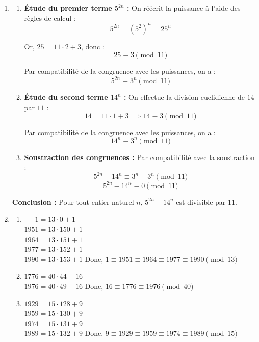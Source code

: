 \begin{enumerate}[label=\thechapter.\arabic*, font=\bfseries, itemsep=7mm,labelsep*=3mm,left=0mm]
\item

\begin{enumerate}
	\item \textbf{Étude du premier terme $5^{2n}$ :}
	On réécrit la puissance à l'aide des règles de calcul :
	$$5^{2n} = \left(5^2\right)^n = 25^n$$
	
	Or, $25 = 11 \cdot 2 + 3$, donc :
	$$25 \equiv 3 \pmod{11}$$
	
	Par compatibilité de la congruence avec les puissances, on a :
	$$5^{2n} \equiv 3^n \pmod{11}$$
	
	\item \textbf{Étude du second terme $14^n$ :}
	On effectue la division euclidienne de $14$ par $11$ :
	$$14 = 11 \cdot 1 + 3 \implies 14 \equiv 3 \pmod{11}$$
	
	Par compatibilité de la congruence avec les puissances, on a :
	$$14^n \equiv 3^n \pmod{11}$$
	
	\item \textbf{Soustraction des congruences :}
	Par compatibilité avec la soustraction :
	$$5^{2n} - 14^n \equiv 3^n - 3^n \pmod{11}$$
	$$5^{2n} - 14^n \equiv 0 \pmod{11}$$
\end{enumerate}

\textbf{Conclusion :} 
Pour tout entier naturel $n$, $5^{2n} - 14^n$ est divisible par $11$.


\item
\begin{enumerate}[label=\roman*),itemsep=5mm,left=-1mm,labelsep*=2mm]
	\item $\phantom{195}1=13\cdot 0+1$\\
	$1951=13\cdot 150+1$\\
	$1964=13\cdot 151+1$\\
	$1977=13\cdot 152+1$\\
	$1990=13\cdot 153+1$  Donc, $1\equiv 1951 \equiv 1964 \equiv 1977 \equiv 1990 \pmod{13}$
	
	\item $1776=40\cdot 44+16$\\
	$1976=40\cdot 49+16$  Donc, $16\equiv 1776 \equiv 1976  \pmod{40}$
	
	\item $1929=15\cdot 128+9$\\
	$1959=15\cdot 130+9$\\
	$1974=15\cdot 131+9$\\
	$1989=15\cdot 132+9$  Donc, $9\equiv 1929 \equiv 1959 \equiv 1974 \equiv 1989 \pmod{15}$
	

\end{enumerate}
\end{enumerate}

